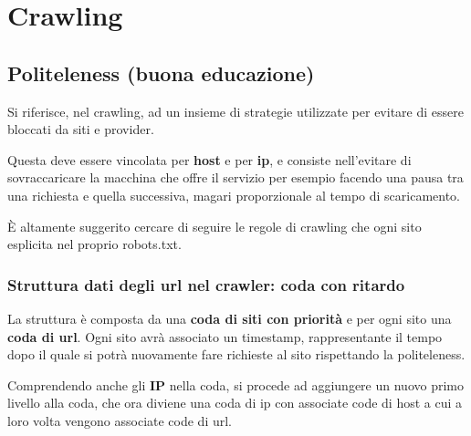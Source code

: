 \documentclass[\main/main.tex]{subfiles}
\begin{document}
\chapter{Crawling}
\section{Politeleness (buona educazione)}
Si riferisce, nel crawling, ad un insieme di strategie utilizzate per evitare di essere bloccati da siti e provider.

Questa deve essere vincolata per \textbf{host} e per \textbf{ip}, e consiste nell'evitare di sovraccaricare la macchina che offre il servizio per esempio facendo una pausa tra una richiesta e quella successiva, magari proporzionale al tempo di scaricamento.

È altamente suggerito cercare di seguire le regole di crawling che ogni sito esplicita nel proprio robots.txt.

\subsection{Struttura dati degli url nel crawler: coda con ritardo}
La struttura è composta da una \textbf{coda di siti con priorità} e per ogni sito una \textbf{coda di url}. Ogni sito avrà associato un timestamp, rappresentante il tempo dopo il quale si potrà nuovamente fare richieste al sito rispettando la politeleness.

Comprendendo anche gli \textbf{IP} nella coda, si procede ad aggiungere un nuovo primo livello alla coda, che ora diviene una coda di ip con associate code di host a cui a loro volta vengono associate code di url.
\end{document}
